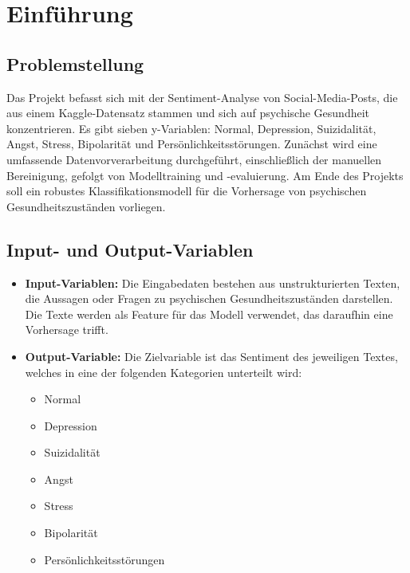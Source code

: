 \section{Einführung}

\subsection{Problemstellung}
Das Projekt befasst sich mit der Sentiment-Analyse von Social-Media-Posts, die aus einem Kaggle-Datensatz stammen und sich auf psychische Gesundheit konzentrieren. Es gibt sieben y-Variablen: Normal, Depression, Suizidalität, Angst, Stress, Bipolarität und Persönlichkeitsstörungen. Zunächst wird eine umfassende Datenvorverarbeitung durchgeführt, einschließlich der manuellen Bereinigung, gefolgt von Modelltraining und -evaluierung. Am Ende des Projekts soll ein robustes Klassifikationsmodell für die Vorhersage von psychischen Gesundheitszuständen vorliegen.

\subsection{Input- und Output-Variablen}
\begin{itemize}
    \item \textbf{Input-Variablen:} Die Eingabedaten bestehen aus unstrukturierten Texten, die Aussagen oder Fragen zu psychischen Gesundheitszuständen darstellen. Die Texte werden als Feature für das Modell verwendet, das daraufhin eine Vorhersage trifft.

    \item \textbf{Output-Variable:} Die Zielvariable ist das Sentiment des jeweiligen Textes, welches in eine der folgenden Kategorien unterteilt wird:
        \begin{itemize}
            \item Normal
            \item Depression
            \item Suizidalität
            \item Angst
            \item Stress
            \item Bipolarität
            \item Persönlichkeitsstörungen
        \end{itemize}
    \end{itemize}

